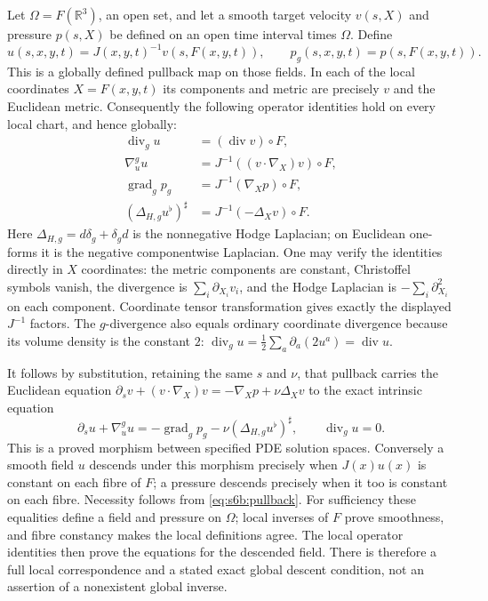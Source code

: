 Let $\Omega=F(\mathbb R^3)$, an open set, and let a smooth target velocity
$v(s,X)$ and pressure $p(s,X)$ be defined on an open time interval times
$\Omega$.  Define
\begin{equation}
 u(s,x,y,t)=J(x,y,t)^{-1}v(s,F(x,y,t)),\qquad
 p_g(s,x,y,t)=p(s,F(x,y,t)).
 \label{eq:s6b:pullback}
\end{equation}
This is a globally defined pullback map on those fields.  In each of the
local coordinates $X=F(x,y,t)$ its components and metric are precisely
$v$ and the Euclidean metric.  Consequently the following operator
identities hold on every local chart, and hence globally:
\begin{align*}
 \operatorname{div}_g u&=(\operatorname{div}v)\circ F,\\
 \nabla^g_u u&=J^{-1}((v\cdot\nabla_X)v)\circ F,\\
 \operatorname{grad}_g p_g&=J^{-1}(\nabla_Xp)\circ F,\\
 (\Delta_{H,g}u^\flat)^\sharp
       &=J^{-1}(-\Delta_Xv)\circ F.
\end{align*}
Here $\Delta_{H,g}=d\delta_g+\delta_gd$ is the nonnegative Hodge Laplacian;
on Euclidean one-forms it is the negative componentwise Laplacian.
One may verify the identities directly in $X$ coordinates: the metric
components are constant, Christoffel symbols vanish, the divergence is
$\sum_i\partial_{X_i}v_i$, and the Hodge Laplacian is
$-\sum_i\partial_{X_i}^2$ on each component.  Coordinate tensor
transformation gives exactly the displayed $J^{-1}$ factors.
The $g$-divergence also equals ordinary coordinate divergence because its
volume density is the constant $2$:
$\operatorname{div}_gu=\frac12\sum_a\partial_a(2u^a)
=\operatorname{div}u$.

It follows by substitution, retaining the same $s$ and $\nu$, that pullback
carries the Euclidean equation
$\partial_sv+(v\cdot\nabla_X)v=-\nabla_Xp+\nu\Delta_Xv$
to the exact intrinsic equation
\[
 \partial_su+\nabla^g_u u
 =-\operatorname{grad}_gp_g-\nu(\Delta_{H,g}u^\flat)^\sharp,
 \qquad \operatorname{div}_gu=0.
\]
This is a proved morphism between specified PDE solution spaces.
Conversely a smooth field $u$ descends under this morphism precisely when
$J(x)u(x)$ is constant on each fibre of $F$; a pressure descends precisely
when it too is constant on each fibre.  Necessity follows from
\eqref{eq:s6b:pullback}.  For sufficiency these equalities define a field
and pressure on $\Omega$; local inverses of $F$ prove smoothness, and
fibre constancy makes the local definitions agree.  The local operator
identities then prove the equations for the descended field.  There is
therefore a full local correspondence and a stated exact global descent
condition, not an assertion of a nonexistent global inverse.

